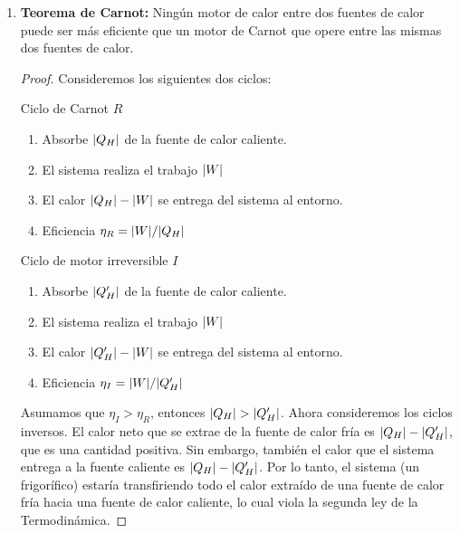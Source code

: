\begin{itemize}
\begin{enumerate}
\item \textbf{Teorema de Carnot:} Ningún motor de calor entre
dos fuentes de calor puede ser más eficiente que un motor de
Carnot que opere entre las mismas dos fuentes de calor.
\begin{proof}
Consideremos los siguientes dos ciclos:
\begin{multicols}{2}
\setlength{\columnseprule}{0pt}
\centering
Ciclo de Carnot $R$
\begin{enumerate}
\item Absorbe $\abs{Q_H}$ de la fuente de calor caliente.
\item El sistema realiza el trabajo $\abs{W}$
\item El calor $\abs{Q_H}-\abs{W}$ se entrega del sistema al entorno.
\item Eficiencia $\eta_R=\abs{W}/\abs{Q_H}$
\end{enumerate} 
\columnbreak
\centering
Ciclo de motor irreversible $I$
\begin{enumerate}
\item Absorbe $\abs{Q_H'}$ de la fuente de calor caliente.
\item El sistema realiza el trabajo $\abs{W}$
\item El calor $\abs{Q_H'}-\abs{W}$ se entrega del sistema al entorno.
\item Eficiencia $\eta_I=\abs{W}/\abs{Q_H'}$
\end{enumerate}
\end{multicols}
Asumamos que $\eta_I>\eta_R$, entonces $\abs{Q_H}>\abs{Q_H'}$. Ahora 
consideremos los ciclos inversos. El calor neto que se extrae 
de la fuente de calor fría es $\abs{Q_H}-\abs{Q_H'}$, que es una cantidad
positiva. Sin embargo, también el calor que el sistema entrega
a la fuente caliente es $\abs{Q_H}-\abs{Q_H'}$. Por lo tanto, el sistema
(un frigorífico) estaría transfiriendo todo el calor extraído de una 
fuente de calor fría hacia una fuente de calor caliente, lo cual 
viola la segunda ley de la Termodinámica. 
\end{proof}
\end{enumerate}
\end{itemize}

































